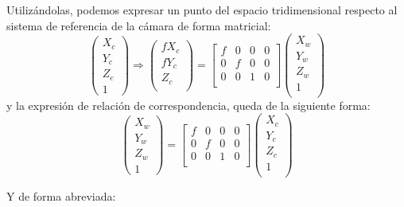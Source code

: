 Utilizándolas, podemos expresar un punto del espacio tridimensional respecto al sistema de referencia de la cámara de forma matricial:
\begin{equation} 
\begin{pmatrix}
    X_{c} \\
    Y_{c} \\
    Z_{c} \\
    1
  \end{pmatrix}
  \Longrightarrow
  \begin{pmatrix}
    fX_{c} \\
    fY_{c} \\
    Z_{c} \\
  \end{pmatrix}
  =
  \begin{bmatrix} f & 0 & 0 & 0 \\ 0 & f & 0 & 0 \\ 0 & 0 & 1 & 0 \\\end{bmatrix}
  \begin{pmatrix} X_{w} \\  Y_{w} \\  Z_{w} \\  1 \\\end{pmatrix}
\end{equation}
y la expresión de relación de correspondencia, queda de la siguiente forma:
\begin{equation} 
\begin{pmatrix}
    X_{w} \\
    Y_{w} \\
    Z_{w} \\
    1
  \end{pmatrix}
=
  \begin{bmatrix} f & 0 & 0 & 0 \\ 0 & f & 0 & 0 \\ 0 & 0 & 1 & 0 \\\end{bmatrix}
  \begin{pmatrix} X_{c} \\  Y_{c} \\  Z_{c} \\  1 \\\end{pmatrix}
\end{equation}

Y de forma abreviada:

